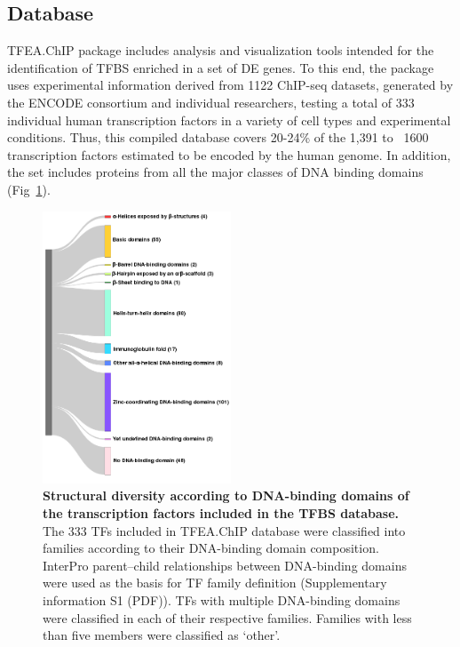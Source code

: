 \documentclass[10pt,letterpaper]{article}
\begin{document}
\subsection*{Database}
 TFEA.ChIP package includes analysis and visualization tools intended for the identification of TFBS enriched in a set of DE genes. To this end, the package uses experimental information derived from 1122 ChIP-seq datasets, generated by the ENCODE consortium and individual researchers, testing a total of 333 individual human transcription factors in a variety of cell types and experimental conditions. Thus, this compiled database covers 20-24\% of the 1,391\cite{TFcensus} to ~1600 \cite{Lambert2018} transcription factors estimated to be encoded by the human genome. In addition, the set includes proteins from all the major classes of DNA binding domains (Fig~\ref{fig1}).
 

\begin{figure}[!h]
 	\centering
 	\includegraphics[width=0.5\textwidth]{superclases}
 	\caption{{\bf Structural diversity according to DNA-binding domains of the transcription factors included in the TFBS database.} The 333 TFs included in TFEA.ChIP database were classified into families according to their DNA-binding domain composition. InterPro parent–child relationships between DNA-binding domains were used as the basis for TF family definition (Supplementary information S1 (PDF)). TFs with multiple DNA-binding domains were classified in each of their respective families. Families with less than five members were classified as ‘other’.}
 	\label{fig1}
\end{figure} 
\end{document}
